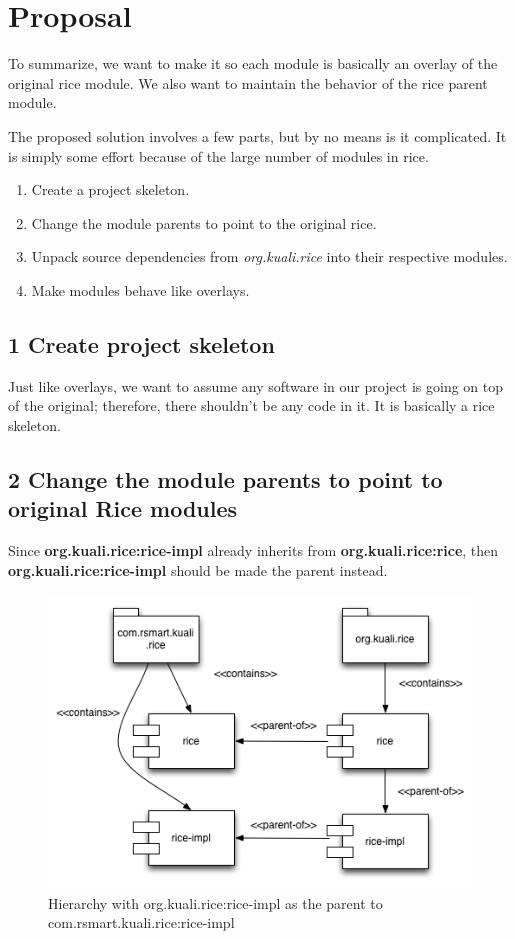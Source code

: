\documentclass[12pt,notitlepage]{article}
\begin{document}
\section{Proposal}
To summarize, we want to make it so each module is basically an overlay of the original rice module. We also want to maintain the behavior of the rice parent module.

The proposed solution involves a few parts, but by no means is it complicated. It is simply some effort because of the large number of modules in rice.
\begin{enumerate}
\item Create a project skeleton.
\item Change the module parents to point to the original rice.
\item Unpack source dependencies from \emph{org.kuali.rice} into their respective modules.
\item Make modules behave like overlays.
\end{enumerate}

\subsection*{1 Create project skeleton}
Just like overlays, we want to assume any software in our project is going on top of the original; therefore, there shouldn't be any code in it. It is basically a rice skeleton.

\subsection*{2 Change the module parents to point to original Rice modules}

Since \textbf{org.kuali.rice:rice-impl} already inherits from \textbf{org.kuali.rice:rice}, then \textbf{org.kuali.rice:rice-impl} should be made the parent instead.

\begin{figure}[!hbp]
  \includegraphics[width=\textwidth]{diagrams/RiceMaven2.png}
  \caption{Hierarchy with org.kuali.rice:rice-impl as the parent to com.rsmart.kuali.rice:rice-impl}
\end{figure}
\end{document}
